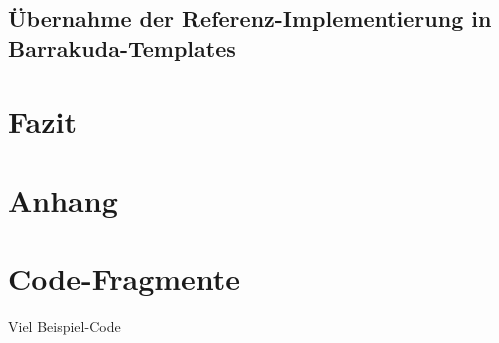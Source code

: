 \documentclass[12pt,a4paper,bibliography=totocnumbered,listof=totocnumbered]{scrartcl}
\begin{document}
\subsection{Übernahme der Referenz-Implementierung in Barrakuda-Templates}

\section{Fazit}

\renewcommand\refname{Quellenverzeichnis}


\pagebreak

\setcounter{page}{1}

\begin{appendix}
\section*{Anhang}
{}

\section{Code-Fragmente}
Viel Beispiel-Code

\end{appendix}
\end{document}
